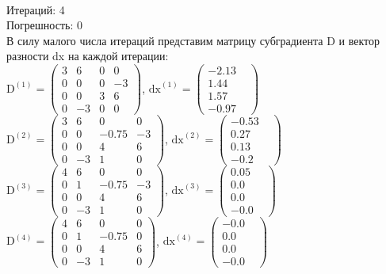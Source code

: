 \documentclass[../body.tex]{subfiles}
\begin{document}
\\Итераций: 4
\\Погрешность: 0
\\В силу малого числа итераций представим матрицу субградиента D и вектор разности dx на каждой итерации:
\\$\textrm{D}^{(1)} = \begin{pmatrix}
        3& 6& 0& 0\\
        0& 0& 0& -3\\
        0& 0& 3& 6\\
        0& -3& 0& 0
        \end{pmatrix}$, $\textrm{dx}^{(1)} = \begin{pmatrix}
        -2.13&\\
        1.44&\\
        1.57&\\
        -0.97&
        \end{pmatrix}$
\\$\textrm{D}^{(2)} = \begin{pmatrix}
        3& 6& 0& 0\\
        0& 0& -0.75& -3\\
        0& 0& 4& 6\\
        0& -3& 1& 0
        \end{pmatrix}$, $\textrm{dx}^{(2)} = \begin{pmatrix}
        -0.53&\\
        0.27&\\
        0.13&\\
        -0.2&
        \end{pmatrix}$
\\$\textrm{D}^{(3)} = \begin{pmatrix}
        4& 6& 0& 0\\
        0& 1& -0.75& -3\\
        0& 0& 4& 6\\
        0& -3& 1& 0
        \end{pmatrix}$, $\textrm{dx}^{(3)} = \begin{pmatrix}
        0.05&\\
        0.0&\\
        0.0&\\
        -0.0&
        \end{pmatrix}$
\\$\textrm{D}^{(4)} = \begin{pmatrix}
        4& 6& 0& 0\\
        0& 1& -0.75& 0\\
        0& 0& 4& 6\\
        0& -3& 1& 0
        \end{pmatrix}$, $\textrm{dx}^{(4)} = \begin{pmatrix}
        -0.0&\\
        0.0&\\
        0.0&\\
        -0.0&
        \end{pmatrix}$
\end{document}
